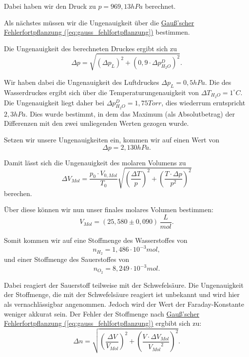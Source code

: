 Dabei haben wir den Druck zu $p = 969,13 hPa$ berechnet.

Als nächstes müssen wir die Ungenauigkeit über die \hyperref[eq:gauss_fehlfortpflanzung]{Gauß'scher Fehlerfortpflanzung (\ref*{eq:gauss_fehlfortpflanzung})} bestimmen. 

Die Ungenauigkeit des berechneten Druckes ergibt sich zu
\begin{equation}
    \Delta p = \sqrt{(\Delta p_L)^2 + (0,9 \cdot \Delta p_{H_2O}^D)^2}.
\end{equation}

Wir haben dabei die Ungenauigkeit des Luftdruckes $\Delta p_L = 0,5 hPa$. Die des Wasserdruckes ergibt sich über die Temperaturungenauigkeit von $\Delta T_{H_2O} =1^\circ C$.
Die Ungenauigkeit liegt daher bei $\Delta p_{H_2O}^D = 1,75 Torr$, dies wiederrum erntspricht $2,3 hPa$. Dies wurde bestimmt, in dem das Maximum (als Absolutbetrag) der Differenzen mit den zwei umliegenden Werten gezogen wurde.

Setzen wir unsere Ungenauigkeiten ein, kommen wir auf einen Wert von
\begin{equation}
    \Delta p = 2,130 hPa.
\end{equation}

Damit lässt sich die Ungenauigkeit des molaren Volumens zu 
\begin{equation}
    \Delta V_{Mol} = \frac{p_0 \cdot V_{0,Mol}}{T_0} \sqrt{\left(\frac{\Delta T}{p}\right)^2 + \left(\frac{T \cdot \Delta p}{p^2}\right)^2}
\end{equation}  
berechen.

Über diese können wir nun unser finales molares Volumen bestimmen:
\begin{equation}
\boxed{
    V_{Mol} = (25,580 \pm 0,090)\, \frac{L}{mol}.
}
\end{equation}

Somit kommen wir auf eine Stoffmenge des Wasserstoffes von
\begin{equation}
    n_{H_2} = 1,486 \cdot 10^{-3} mol, 
\end{equation}
und einer Stoffmenge des Sauerstoffes von 
\begin{equation}
    n_{O_2} = 8,249 \cdot 10^{-3} mol.
\end{equation}

Dabei reagiert der Sauerstoff teilweise mit der Schwefelsäure. Die Ungenauigkeit der Stoffmenge, die mit der Schwefelsäure reagiert ist unbekannt und wird hier als vernachlässigbar angenommen. Jedoch wird der Wert der Faraday-Konstante weniger akkurat sein.
Der Fehler der Stoffmenge nach \hyperref[eq:gauss_fehlfortpflanzung]{Gauß'scher Fehlerfortpflanzung (\ref*{eq:gauss_fehlfortpflanzung})} ergbibt sich zu:
\begin{equation}
    \Delta n = \sqrt{\left(\frac{\Delta V}{V_{Mol}}\right)^2 + \left(\frac{V \cdot \Delta V_{Mol}}{{V_{Mol}}^2}\right)^2}.
\end{equation}

